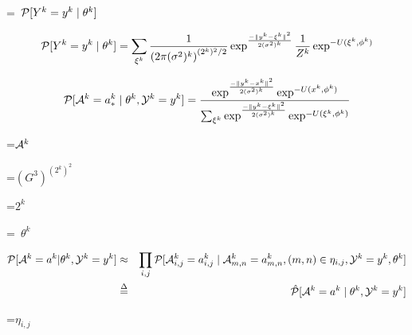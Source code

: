 {\newpage
\clearpage
\samepage \setbox\sizebox=\hbox{%
$\P[Y^k=y^k \mid \theta^k]$}\box\sizebox
}

{\newpage
\clearpage
\samepage \begin{displaymath}%
\P[Y^k=y^k \mid \theta^k] = \sum_{\xi^k}\frac{1}{{(2 \pi
(\sigma^2)^k)}^{{(2^k)^2}/2}} \exp^{\frac{- { 
\|y^k-\xi^k\|}^{2}}{2(\sigma^2)^k}} \frac{1}{Z^k} \exp^{-U(\xi^k, \phi^k)}
 \end{displaymath}
}

{\newpage
\clearpage
\samepage \begin{equation}%
\P[\X^k=\x^{k}_* 
\mid \theta^k, \Y^k=y^k  ]
= \frac{ \exp^{\frac{- { \|y^k-x^k\|}^{2}}{2(\sigma^2)^k}} \exp^{-U(x^{k}, 
\phi^k)} }
{\sum_{\xi^k}\exp^{\frac{- { 
\|y^k-\xi^k\|}^{2}}{2(\sigma^2)^k}}\exp^{-U(\xi^k, \phi^k)}} 
 \label{res_4}
 \end{equation}
}

{\newpage
\clearpage
\samepage \setbox\sizebox=\hbox{$\X^k$}\box\sizebox
}

{\newpage
\clearpage
\samepage \setbox\sizebox=\hbox{$(G^3)^{(2^k)^2}$}\box\sizebox
}

{\newpage
\clearpage
\samepage \setbox\sizebox=\hbox{$2^k$}\box\sizebox
}

{\newpage
\clearpage
\samepage \setbox\sizebox=\hbox{%
$\theta^k $}\box\sizebox
}

{\newpage
\clearpage
\samepage \begin{eqnarray}%
\P[\X^k=\x^k | \theta^k, \Y^k=y^k ] &\approx& \prod_{i,j}
\P[\X^k_{i,j}=\x^k_{i,j}
\mid \X^k_{m,n} = \x^k_{m,n}, (m,n) \in \eta_{i,j}, \Y^k=y^k, \theta^k] 
\nonumber
  \\ 
&\stackrel{\Delta}{=}
 & \hat{\P}[\X^k=\x^k \mid \theta^k, \Y^k=y^k]
\label{mrf6}
\end{eqnarray}
}

{\newpage
\clearpage
\samepage \setbox\sizebox=\hbox{$\eta_{i,j}$}\box\sizebox
}

